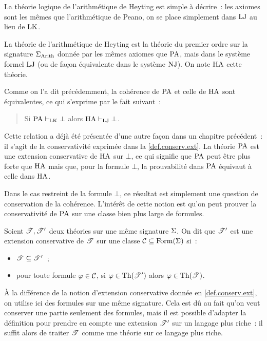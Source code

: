La théorie logique de l'arithmétique de Heyting est simple à décrire~: les
axiomes sont les mêmes que l'arithmétique de Peano, on se place simplement dans
$\operatorname{LJ}$ au lieu de $\operatorname{LK}$.

\begin{definition}
  La théorie de l'arithmétique de Heyting est la théorie du premier ordre sur
  la signature $\Sigma_{\operatorname{Arith}}$ donnée par les mêmes axiomes que $\operatorname{PA}$,
  mais dans le système formel $\operatorname{LJ}$ (ou de façon équivalente dans le système
  $\operatorname{NJ}$). On note $\HA$ cette théorie.
  \index[notation]{$\HA$}
\end{definition}

Comme on l'a dit précédemment, la cohérence de $\operatorname{PA}$ et celle de $\HA$
sont équivalentes, ce qui s'exprime par le fait suivant~:
\begin{quotation}
  \noindent
  Si $\operatorname{PA}\vdash_{\operatorname{LK}} \bot$ alors $\operatorname{HA}\vdash_{\operatorname{LJ}}\bot$.
\end{quotation}
Cette relation a déjà été présentée d'une autre façon dans un chapitre
précédent~: il s'agit de la conservativité exprimée dans la
\cref{def.conserv.ext}. La théorie $\operatorname{PA}$ est une extension conservative
de $\HA$ sur $\bot$, ce qui signifie que $\operatorname{PA}$ peut être plus forte que
$\HA$ mais que, pour la formule $\bot$, la prouvabilité dans $\operatorname{PA}$
équivaut à celle dans $\HA$.

Dans le cas restreint de la formule $\bot$, ce résultat est simplement une
question de conservation de la cohérence. L'intérêt de cette notion est qu'on
peut prouver la conservativité de $\operatorname{PA}$ sur une classe bien plus large
de formules.

\begin{definition}
  Soient $\mathscr T,\mathscr T'$ deux théories sur une même signature $\Sigma$. On dit
  que $\mathscr T'$ est une extension conservative de $\mathscr T$ sur une classe
  $\mathcal{C} \subseteq \operatorname{Form}(\Sigma)$ si~:
  \begin{itemize}
  \item $\mathscr T \subseteq \mathscr T'$~;
  \item pour toute formule $\varphi \in \mathcal{C}$, si
    $\varphi \in \operatorname{Th}(\mathscr T')$ alors $\varphi \in \operatorname{Th}(\mathscr T)$.
  \end{itemize}
\end{definition}

\begin{remark}
  \`A la différence de la notion d'extension conservative donnée en
  \cref{def.conserv.ext}, on utilise ici des formules sur une même signature.
  Cela est dû au fait qu'on veut conserver une partie seulement des formules,
  mais il est possible d'adapter la définition pour prendre en compte une
  extension $\mathscr T'$ sur un langage plus riche~: il suffit alors de traiter
  $\mathscr T$ comme une théorie sur ce langage plus riche.
\end{remark}

